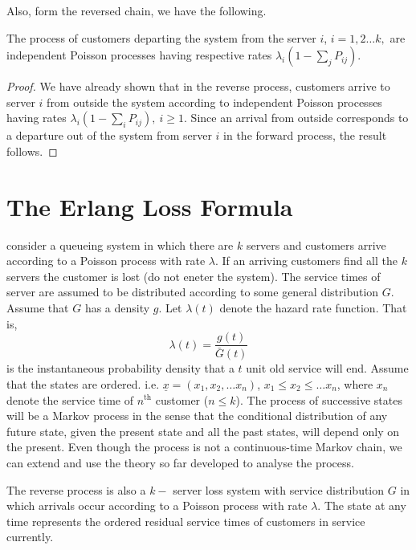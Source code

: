 \documentclass[a4paper,10pt,english]{article}
\begin{document}
Also, form the reversed chain, we have the following.
\begin{cor}
The process of customers departing the system from the server $i$, $i=1,2 \hdots k,$ are independent Poisson processes having respective rates $\lambda_i (1-\sum_j P_{ij} )$.
\end{cor}
\begin{proof}
We have already shown that in the reverse process, customers arrive to server $i$ from outside the system according to independent Poisson processes having rates $\lambda_i(1-\sum_{i}P_{ij}),~ i \geq 1$. Since an arrival from outside corresponds to a departure out of the system from server $i$ in the forward process, the result follows. 
\end{proof}


\section{The Erlang Loss Formula}
consider a queueing system in which there are $k$ servers and customers arrive according to a Poisson process with rate $\lambda$. If an arriving customers find all the $k$ servers the customer is lost (do not eneter the system). The service times of server are assumed to be distributed according to some general distribution $G$. Assume that $G$ has a density $g$. Let $\lambda(t)$ denote the hazard rate function. That is,
\begin{equation*}
\lambda(t)=\frac{g(t)}{\bar{G}(t)}
\end{equation*}
is the instantaneous probability density that a $t$ unit old service will end. Assume that the states are ordered. i.e. $\underline{x}=(x_1,x_2, \hdots x_n)$, $x_1 \leq x_2 \leq \hdots x_n$, where $x_n$ denote the service time of $n^{\text{th}}$ customer ($n \leq k$). The process of successive states will be a Markov process in the sense that the conditional distribution of any future state, given the present state and all the past states, will depend only on the present. Even though the process is not a continuous-time Markov chain, we can extend and use the theory so far developed to analyse the process.
\begin{cor}
The reverse process is also a $k-$ server loss system with service distribution $G$ in which arrivals occur according to a Poisson process with rate $\lambda$. The state at any time represents the ordered residual service times of customers in service currently.
\end{cor}  
\end{document}
